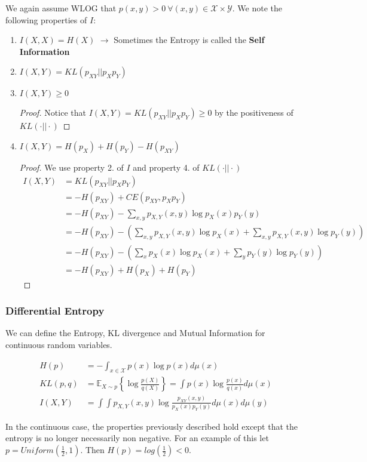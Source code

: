 \documentclass[]{article}
\theoremstyle{mattstyle}
\theoremstyle{definition}
\begin{document}
We again assume WLOG that \(p(x,y)>0 \ \forall (x,y)\in\mathcal{X}\times\mathcal{Y}\). We note the following properties of $I$:

\begin{enumerate}
	\item \(I(X,X) = H(X)\) \(\rightarrow\) Sometimes the Entropy is called the \textbf{Self Information}
	\item $I(X,Y) = KL(p_{XY}||p_Xp_Y)$
	\item \(I(X,Y)\ge 0\)
	\begin{proof}
		Notice that \(I(X,Y) = KL(p_{XY}||p_Xp_Y) \ge 0\) by the positiveness of \(KL(\cdot||\cdot)\)
	\end{proof}
	\item $I(X,Y) = H(p_X) + H(p_Y) -H(p_{XY})$
	\begin{proof} We use property 2. of $I$ and property 4. of \(KL(\cdot||\cdot)\)
		\begin{align*}
		I(X,Y) &= KL(p_{XY}||p_Xp_Y) \\
		&= -H(p_{XY}) + CE(p_{XY},p_Xp_Y) \\
		&= -H(p_{XY}) - \sum_{x,y}p_{X,Y}(x,y)\log p_X(x)p_Y(y)\\
		&= -H(p_{XY}) - \left(\sum_{x,y}p_{X,Y}(x,y)\log p_X(x) + \sum_{x,y}p_{X,Y}(x,y)\log p_Y(y)\right)\\
		&=-H(p_{XY}) - \left(\sum_{x}p_{X}(x)\log p_X(x) + \sum_{y}p_{Y}(y)\log p_Y(y)\right)\\
		&= -H(p_{XY}) + H(p_X) + H(p_Y)
		\end{align*}
	\end{proof}
	
\end{enumerate}

\subsubsection{Differential Entropy}
We can define the Entropy, KL divergence and Mutual Information for continuous random variables.

\begin{align}
H(p) &= -\int_{x\in\mathcal{X}}p(x)\log p(x)d\mu(x) \\
KL(p,q) &= \mathbb{E}_{X\sim p}\left\{\log \frac{p(X)}{q(X)}\right\} = \int p(x)\log\frac{p(x)}{q(x)}d\mu(x)\\
I(X,Y) &=\int\int p_{X,Y}(x,y)\log\frac{p_{XY}(x,y)}{p_X(x)p_Y(y)}d\mu(x)d\mu(y)
\end{align}

In the continuous case, the properties previously described hold except that the entropy is no longer necessarily non negative. For an example of this let $p = Uniform\left(\frac{1}{2},1\right)$. Then $H(p) = log(\frac{1}{2}) < 0$.
\end{document}
